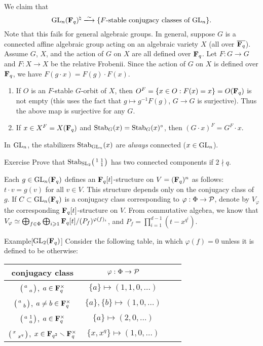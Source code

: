 We claim that 
\[
  \generallinear_n(\dF_q)^\natural\isomorphism \{\text{$F$-stable conjugacy classes of $\generallinear_n$}\} . 
\]
Note that this fails for general algebraic groups. In general, suppose $G$ 
is a connected affine algebraic group acting on an algebraic variety $X$ (all 
over $\overline{\mathbf{F}_q}$). Assume $G$, $X$, and the action of $G$ on $X$ are all 
defined over $\mathbf{F}_q$. Let $F:G\to G$ and $F:X\to X$ be the relative Frobenii. 
Since the action of $G$ on $X$ is defined over $\mathbf{F}_q$, we have 
$F(g\cdot x) = F(g) \cdot F(x)$. 
\begin{enumerate}
  \item If $O$ is an $F$-stable $G$-orbit of $X$, then 
    $O^F=\{x\in O:F(x)=x\}=O(\mathbf{F}_q)$ is not empty (this uses the fact that 
    $g\mapsto g^{-1} F(g)$, $G\to G$ is surjective). Thus the above map is 
    surjective for any $G$. 
  \item If $x\in X^F=X(\mathbf{F}_q)$ and $\operatorname{Stab}_G(x) = \operatorname{Stab}_G(x)^\circ$, 
    then $(G\cdot x)^F = G^F\cdot x$. 
\end{enumerate}

In $\operatorname{GL}_n$, the stabilizers $\operatorname{Stab}_{\operatorname{GL}_n}(x)$ are 
\emph{always} connected ($x\in \operatorname{GL}_n$). 

\begin{enonce}[remark]{Exercise}
Prove that $\operatorname{Stab}_{\operatorname{SL}_2}\bigl(\begin{smallmatrix} 1 & 1 \\  & 1 \end{smallmatrix} \bigr)$ has two connected 
components if $2\nmid q$. 
\end{enonce}

Each $g\in \operatorname{GL}_n(\mathbf{F}_q)$ defines an $\mathbf{F}_q[t]$-structure on 
$V=(\mathbf{F}_q)^n$ as follows: $t\cdot v = g(v)$ for all $v\in V$. This structure 
depends only on the conjugacy class of $g$. If 
$C\subset \operatorname{GL}_n(\mathbf{F}_q)$ is a conjugacy class corresponding to 
$\varphi:\Phi \to \mathcal{P}$, denote by $V_\varphi$ the corresponding 
$\mathbf{F}_q[t]$-structure on $V$. From commutative algebra, we know that 
$V_\varphi \simeq \bigoplus_{f\in \Phi} \bigoplus_{i\geqslant 1} \mathbf{F}_q[t] / (P_f)^{\varphi(f)_i}$, and 
$P_f = \prod_{i=1}^{d-1} (t-x^{q^i})$. 

\begin{enonce}[remark]{Example}[$\operatorname{GL}_2(\mathbf{F}_q)$]
Consider the following table, in which $\varphi(f)=0$ unless it is defined to 
be otherwise:
\begin{center}
\begin{tabular}{c|ccc}
conjugacy class & $\varphi:\Phi\to \mathcal{P}$ \\ \hline
$\bigl(\begin{smallmatrix} a &  \\  & a \end{smallmatrix} \bigr)$, $a\in \mathbf{F}_q^\times$ & $\{a\}\mapsto (1,1,0,\ldots)$ \\
$\bigl(\begin{smallmatrix} a &  \\  & b \end{smallmatrix} \bigr)$, $a\ne b\in \mathbf{F}_q^\times$ & $\{a\},\{b\}\mapsto (1,0,\dots)$ \\
$\bigl(\begin{smallmatrix} a & 1 \\  & a \end{smallmatrix} \bigr)$, $a\in \mathbf{F}_q^\times$ & $\{a\}\mapsto (2,0,\dots)$ \\
$\bigl(\begin{smallmatrix} x &  \\  & x^q \end{smallmatrix} \bigr)$, $x\in \mathbf{F}_{q^2}\smallsetminus \mathbf{F}_q^\times$ & $\{x,x^q\}\mapsto (1,0,\dots)$
\end{tabular}
\end{center}
\end{enonce}





